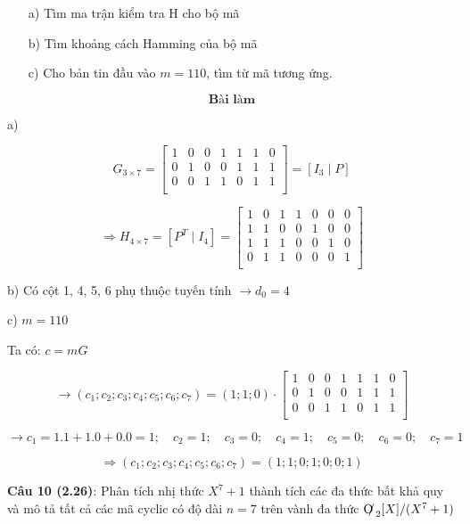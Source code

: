 \documentclass[12pt]{article}
\begin{document}
\begin{itemize}
    \item[a)] Tìm ma trận kiểm tra H cho bộ mã
    \item[b)] Tìm khoảng cách Hamming của bộ mã
    \item[c)] Cho bản tin đầu vào $m = 110$, tìm từ mã tương ứng.
\end{itemize}

\[
\textbf{Bài làm}
\]

a)

\[
G_{3 \times 7} = 
\begin{bmatrix}
1 & 0 & 0 & 1 & 1 & 1 & 0 \\
0 & 1 & 0 & 0 & 1 & 1 & 1 \\
0 & 0 & 1 & 1 & 0 & 1 & 1 \\
\end{bmatrix} = [I_3 \; | \; P]
\]

\[
\Rightarrow H_{4 \times 7} = [P^T \; | \; I_4] = 
\begin{bmatrix}
1 & 0 & 1 & 1 & 0 & 0 & 0 \\
1 & 1 & 0 & 0 & 1 & 0 & 0 \\
1 & 1 & 1 & 0 & 0 & 1 & 0 \\
0 & 1 & 1 & 0 & 0 & 0 & 1 \\
\end{bmatrix}
\]

b) Có cột 1, 4, 5, 6 phụ thuộc tuyến tính $\rightarrow d_0 = 4$

c) $m = 110$

Ta có: $c = mG$

\[
\rightarrow (c_1; c_2; c_3; c_4; c_5; c_6; c_7) = (1; 1; 0)
\cdot 
\begin{bmatrix}
1 & 0 & 0 & 1 & 1 & 1 & 0 \\
0 & 1 & 0 & 0 & 1 & 1 & 1 \\
0 & 0 & 1 & 1 & 0 & 1 & 1 \\
\end{bmatrix}
\]

\[
\rightarrow c_1 = 1.1 + 1.0 + 0.0 = 1; \quad c_2 = 1; \quad c_3 = 0; \quad c_4 = 1; \quad c_5 = 0; \quad c_6 = 0; \quad c_7 = 1
\]

\[
\Rightarrow (c_1; c_2; c_3; c_4; c_5; c_6; c_7) = (1; 1; 0; 1; 0; 0; 1)
\]

\newpage
\textbf{Câu 10 (2.26)}: Phân tích nhị thức $X^7 + 1$  thành tích các đa thức bất khả quy và mô tả tất cả các mã cyclic có độ dài  $n = 7$ trên vành đa thức  $\text{O\kern-0.4em/\kern0.1em}_2[X]/(X^7 + 1)$
\end{document}
